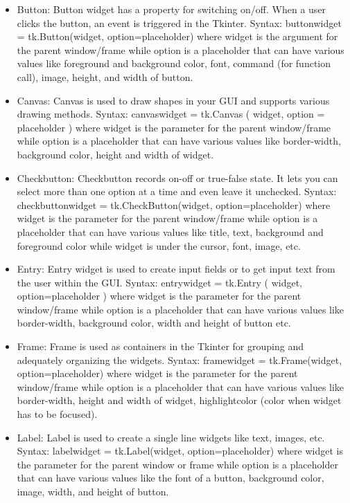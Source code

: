 \documentclass[11pt]{article}
\begin{document}
\begin{itemize}
\item Button: Button widget has a property for switching on/off. When a user clicks the button, an event is triggered in the Tkinter.
Syntax: buttonwidget = tk.Button(widget, option=placeholder) where widget is the argument for the parent window/frame while option is a placeholder that can have various values like foreground and background color, font, command (for function call), image, height, and width of button.
\item Canvas: Canvas is used to draw shapes in your GUI and supports various drawing methods.
Syntax: canvaswidget = tk.Canvas ( widget, option = placeholder )
where widget is the parameter for the parent window/frame while option is a placeholder that can have various values like border-width, background color, height and width of widget.
\item Checkbutton: Checkbutton records on-off or true-false state. It lets you can select more than one option at a time and even leave it unchecked.
Syntax: checkbuttonwidget = tk.CheckButton(widget, option=placeholder)
where widget is the parameter for the parent window/frame while option is a placeholder that can have various values like title, text, background and foreground color while widget is under the cursor, font, image, etc.
\item Entry: Entry widget is used to create input fields or to get input text from the user within the GUI.
Syntax: entrywidget = tk.Entry ( widget, option=placeholder )
where widget is the parameter for the parent window/frame while option is a placeholder that can have various values like border-width, background color, width and height of button etc.
\item Frame: Frame is used as containers in the Tkinter for grouping and adequately organizing the widgets.
Syntax: framewidget = tk.Frame(widget, option=placeholder)
where widget is the parameter for the parent window/frame while option is a placeholder that can have various values like border-width, height and width of widget, highlightcolor (color when widget has to be focused).
\item Label: Label is used to create a single line widgets like text, images, etc.
Syntax: labelwidget = tk.Label(widget, option=placeholder)
where widget is the parameter for the parent window or frame while option is a placeholder
that can have various values like the font of a button, background color, image, width, and
height of button.
\end{itemize}
\end{document}
